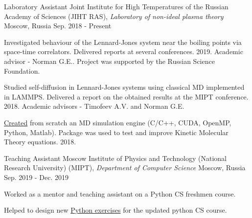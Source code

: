 

\begin{cventries}

  \cventry
    {Laboratory Assistant} %
    {Joint Institute for High Temperatures of the Russian Academy of Sciences (JIHT RAS), \textit{Laboratory of non-ideal plasma theory}} %
    {Moscow, Russia} %
    {Sep. 2018 - Present} %
    {
      \begin{cvitems} %
        \item {Investigated behaviour of the Lennard-Jones system near the boiling points via space-time correlators. Delivered reports at several conferences. 2019. Academic advisor - Norman G.E.. Project was supported by the Russian Science Foundation.}
      	\item {Studied self-diffusion in Lennard-Jones systems using classical MD implemented in LAMMPS. Delivered a report on the obtained results at the MIPT conference. 2018. Academic advisors - Timofeev A.V. and Norman G.E. }
      	\item {\href{https://github.com/PolyachenkoYA/molecules}{Created} from scratch an MD simulation engine (C/C++, CUDA, OpenMP, Python, Matlab). Package was used to test and improve Kinetic Molecular Theory equations.  2018.}
      \end{cvitems}
    }

  \cventry
    {Teaching Assistant} %
    {Moscow Institute of Physics and Technology (National Research University) (MIPT), \newline \textit{Department of Computer Science}} %
    {Moscow, Russia} %
    {Sep. 2019 - Dec. 2019} %
    {
      \begin{cvitems} %
        \item {Worked as a mentor and teaching assistant on a Python CS freshmen course.}
        \item {Helped to design new \href{http://cs.mipt.ru/python}{Python exercises} for the updated python CS course.}
      \end{cvitems}
    }
    

\end{cventries}
